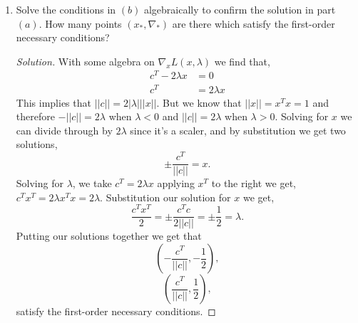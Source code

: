 \documentclass[12pt]{article}
\makeatletter
\theoremstyle{homework}
\newenvironment{exercise}[1]
{\def\@currentlabel{#1}\exercisecore}
{\endexercisecore}
\makeatother
\begin{document}
\begin{exercise}{P21}
\begin{enumerate}
    \item[(c)] Solve the conditions in $(b)$ algebraically to confirm the solution in part $(a)$.
    How many points $(x_*, \nabla_*)$ are there which satisfy the first-order necessary conditions?
    \begin{proof}[Solution] With some algebra on $\nabla_xL(x, \lambda)$ we find that, 
      \begin{align*}
        c^T - 2\lambda x &= 0\\
        c^T &= 2\lambda x
      \end{align*}
      This implies that $||c|| = 2 |\lambda| ||x||$. But we know that $||x|| = x^Tx = 1$ and therefore $-||c|| = 2\lambda$ when $\lambda < 0$ and $||c|| = 2\lambda$ when $\lambda > 0$.
      Solving for $x$ we can divide through by $2\lambda$ since it's a scaler, and by substitution we get two solutions, 
      \begin{equation*}
        \pm\frac{c^T}{||c||} = x.
      \end{equation*}
      Solving for $\lambda$, we take $c^T = 2\lambda x$ applying $x^T$ to the right we get, $c^Tx^T = 2\lambda x^Tx = 2\lambda$. Substitution our solution for $x$ we get,
      \begin{equation*}
        \frac{c^Tx^T}{2} = \pm\frac{c^Tc}{2||c||} = \pm\frac{1}{2} = \lambda.  
      \end{equation*}
      Putting our solutions together we get that
      \begin{equation*}
        \left(-\frac{c^T}{||c||},-\frac{1}{2} \right),
      \end{equation*}
      \begin{equation*}
        \left(\frac{c^T}{||c||},\frac{1}{2} \right),
      \end{equation*}
      satisfy the first-order necessary conditions. 
    
    \end{proof}

  \end{enumerate}  
\end{exercise}
\vspace{.5in}
\end{document}
